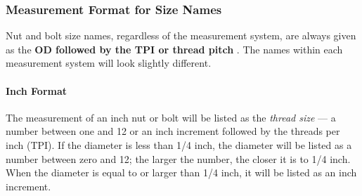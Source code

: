 \documentclass[english,]{article}
\let\oldparagraph\paragraph
\renewcommand{\paragraph}[1]{\oldparagraph{#1}\mbox{}}
\begin{document}
\hypertarget{iazchh}{%
\subsubsection{Measurement Format for Size Names}\label{iazchh}}

\hypertarget{ialm3q}{}
Nut and bolt size names, regardless of the measurement system, are
always given as the \textbf{OD followed by the TPI or thread pitch} .
The names within each measurement system will look slightly different.

\hypertarget{iof4zr}{%
\paragraph{Inch Format}\label{iof4zr}}

\hypertarget{ihinup}{}
The measurement of an inch nut or bolt will be listed as the
\emph{thread size} --- a number between one and 12 or an inch increment
followed by the threads per inch (TPI). If the diameter is less than 1/4
inch, the diameter will be listed as a number between zero and 12; the
larger the number, the closer it is to 1/4 inch. When the diameter is
equal to or larger than 1/4 inch, it will be listed as an inch
increment.
\end{document}

